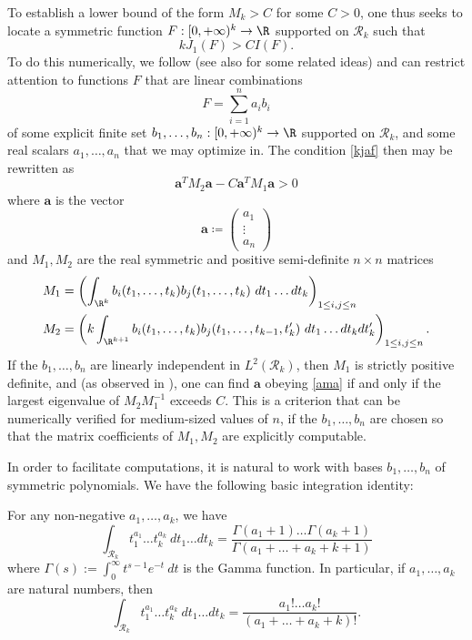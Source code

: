 To establish a lower bound of the form $M_k > C$ for some $C > 0$, one thus seeks to locate a symmetric function $F: [0,+\infty)^k \to \R$ supported on ${\mathcal R}_k$ such that
\begin{equation}\label{kjaf}
 k J_1(F) > C I(F).
\end{equation}
To do this numerically, we follow \cite{maynard-new} (see also \cite{gpy} for some related ideas) and can restrict attention to functions $F$ that are linear combinations
$$ F = \sum_{i=1}^n a_i b_i$$
of some explicit finite set $b_1,\dots,b_n: [0,+\infty)^k \to \R$ supported on ${\mathcal R}_k$, and some real scalars $a_1,\dots,a_n$ that we may optimize in.  The condition \eqref{kjaf} then may be rewritten as
\begin{equation}\label{ama}
 \mathbf{a}^T M_2 \mathbf{a} - C \mathbf{a}^T M_1 \mathbf{a} > 0
\end{equation}
where $\mathbf{a}$ is the vector 
$$ \mathbf{a} \coloneqq \begin{pmatrix} a_1 \\ \vdots \\ a_n \end{pmatrix}
$$
and $M_1,M_2$ are the real symmetric and positive semi-definite $n \times n$ matrices 
\begin{align*}
M_1 &= \left( \int_{\R^k} b_i(t_1,\dots,t_k) b_j(t_1,\dots,t_k)\ dt_1 \dots dt_k \right)_{1 \leq i,j \leq n} \\
M_2 &= \left( k \int_{\R^{k+1}} b_i(t_1,\dots,t_k) b_j(t_1,\dots,t_{k-1},t'_k)\ dt_1 \dots dt_k dt'_k\right)_{1 \leq i,j \leq n}.
\end{align*}
If the $b_1,\dots,b_n$ are linearly independent in $L^2({\mathcal R}_k)$, then $M_1$ is strictly positive definite, and (as observed in \cite[Lemma 7.3]{maynard-new}), one can find $\mathbf{a}$ obeying \eqref{ama} if and only if the largest eigenvalue of $M_2 M_1^{-1}$ exceeds $C$.  This is a criterion that can be numerically verified for medium-sized values of $n$, if the $b_1,\dots,b_n$ are chosen so that the matrix coefficients of $M_1,M_2$ are explicitly computable.

In order to facilitate computations, it is natural to work with bases $b_1,\dots,b_n$ of symmetric polynomials.  We have the following basic integration identity:

\begin{lemma}\label{bfi}  For any non-negative $a_1,\dots,a_k$, we have
$$ \int_{{\mathcal R}_k} t_1^{a_1} \dots t_k^{a_k}\ dt_1 \dots dt_k = \frac{\Gamma(a_1+1) \dots \Gamma(a_k+1)}{\Gamma(a_1+\dots+a_k+k+1)}$$
where $\Gamma(s) := \int_0^\infty t^{s-1} e^{-t}\ dt$ is the Gamma function.  In particular, if $a_1,\dots,a_k$ are natural numbers, then
$$ \int_{{\mathcal R}_k} t_1^{a_1} \dots t_k^{a_k}\ dt_1 \dots dt_k = \frac{a_1! \dots a_k!}{(a_1+\dots+a_k+k)!}.$$
\end{lemma}

